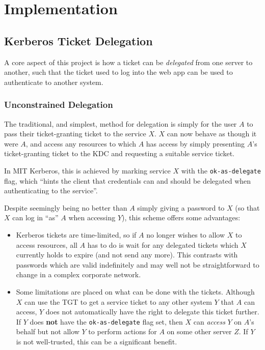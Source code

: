 \documentclass{article}
\begin{document}
\section{Implementation}

\subsection{Kerberos Ticket Delegation}
A core aspect of this project is how a ticket can be \textit{delegated} from one server to another, such that the ticket used to log into the web app can be used to authenticate to another system.

\subsubsection{Unconstrained Delegation}
The traditional, and simplest, method for delegation is simply for the user $A$ to pass their ticket-granting ticket to the service $X$. $X$ can now behave as though it were $A$, and access any resources to which $A$ has access by simply presenting $A$'s ticket-granting ticket to the KDC and requesting a suitable service ticket.

In MIT Kerberos, this is achieved by marking service $X$ with the \verb+ok-as-delegate+ flag, which ``hints the client that credentials can and should be delegated when authenticating to the service''\cite{KDC-conf-docs}.

Despite seemingly being no better than $A$ simply giving a password to $X$ (so that $X$ can log in ``as'' $A$ when accessing $Y$), this scheme offers some advantages:

\begin{itemize}
\item
  Kerberos tickets are time-limited, so if $A$ no longer wishes to allow $X$ to access resources, all $A$ has to do is wait for any delegated tickets which $X$ currently holds to expire (and not send any more). This contrasts with passwords which are valid indefinitely and may well not be straightforward to change in a complex corporate network.
\item
  Some limitations are placed on what can be done with the tickets. Although $X$ can use the TGT to get a service ticket to any other system $Y$ that $A$ can access, $Y$ does not automatically have the right to delegate this ticket further. If $Y$ does \textbf{not} have the \verb+ok-as-delegate+ flag set, then $X$ can \textit{access} $Y$ on $A$'s behalf but not allow $Y$ to perform actions for $A$ on some other server $Z$. If $Y$ is not well-trusted, this can be a significant benefit.
\end{itemize}
\end{document}
